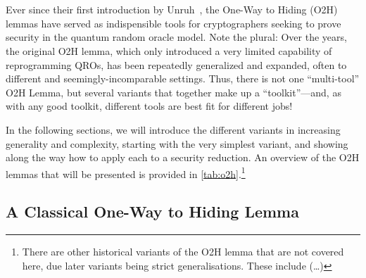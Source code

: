 \section{\titleOtoH}\label{sec:o2h}
  Ever since their first introduction by Unruh~\cite{EC:Unruh14}, the One-Way
    to Hiding (O2H) lemmas
    have served as indispensible tools for cryptographers seeking to prove
    security in the quantum random oracle model.
    Note the plural: Over the years, the original O2H lemma, which only
    introduced a very limited capability of reprogramming QROs, has
    been repeatedly generalized and expanded, often to different
    and seemingly-incomparable settings. Thus, there is not one
    ``multi-tool'' O2H Lemma, but several
    variants that together make up a ``toolkit''---and, as with any good
    toolkit, different tools are best fit for different jobs!

  In the following sections, we will introduce the different variants in
    increasing generality and complexity, starting with the very simplest
    variant, and showing along the way how to apply each to a security
    reduction. An overview of the O2H lemmas that will be presented is provided in
    \cref{tab:o2h}.\footnote{
      There are other historical variants of the O2H lemma that are not covered here,
      due later variants being strict generalisations. These include (\ldots)
    }

  \subsection{A Classical One-Way to Hiding Lemma}


